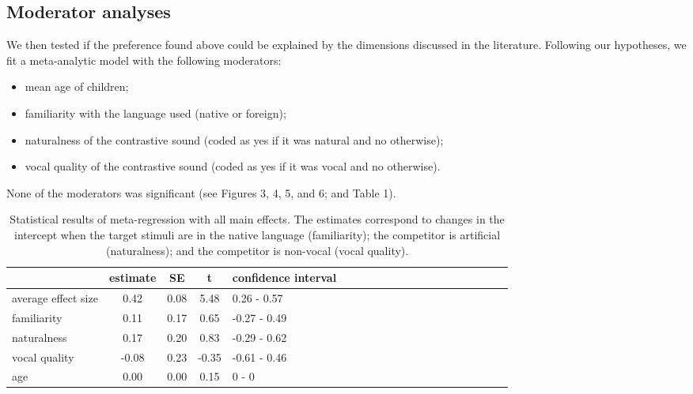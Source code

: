\documentclass[man]{apa6}
\providecommand{\tightlist}{%
  \setlength{\itemsep}{0pt}\setlength{\parskip}{0pt}}
\begin{document}
\subsection{Moderator analyses}\label{moderator-analyses}

We then tested if the preference found above could be explained by the
dimensions discussed in the literature. Following our hypotheses, we fit
a meta-analytic model with the following moderators:

\begin{itemize}
\tightlist
\item
  mean age of children;
\item
  familiarity with the language used (native or foreign);
\item
  naturalness of the contrastive sound (coded as yes if it was natural
  and no otherwise);
\item
  vocal quality of the contrastive sound (coded as yes if it was vocal
  and no otherwise).
\end{itemize}

None of the moderators was significant (see Figures 3, 4, 5, and 6; and
Table 1).

\begin{table}[tbp]
\begin{center}
\begin{threeparttable}
\caption{\label{tab:Table1}Statistical results of meta-regression with all main effects. The estimates correspond to changes in the intercept when the target stimuli are in the native language (familiarity); the competitor is artificial (naturalness); and the competitor is non-vocal (vocal quality).}
\begin{tabular}{lccclccclccclccclccc}
\toprule
 & estimate & SE & t & confidence interval\\
\midrule
average effect size & 0.42 & 0.08 & 5.48 & 0.26 - 0.57\\
familiarity & 0.11 & 0.17 & 0.65 & -0.27 - 0.49\\
naturalness & 0.17 & 0.20 & 0.83 & -0.29 - 0.62\\
vocal quality & -0.08 & 0.23 & -0.35 & -0.61 - 0.46\\
age & 0.00 & 0.00 & 0.15 & 0 - 0\\
\bottomrule
\end{tabular}
\end{threeparttable}
\end{center}
\end{table}
\end{document}
